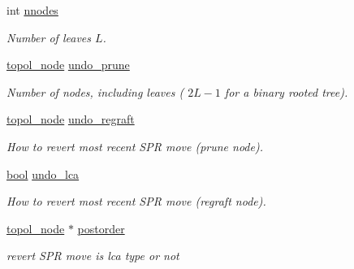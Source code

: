 \begin{DoxyCompactItemize}
\mbox{\label{structtopology__struct_a7eab86ca5fc4e2c0df67b39065eaed95}} 
int \hyperlink{structtopology__struct_a7eab86ca5fc4e2c0df67b39065eaed95}{nnodes}
\begin{DoxyCompactList}\small\item\em Number of leaves $L$. \end{DoxyCompactList}\item 
\mbox{\label{structtopology__struct_ade334ca8a90127e831eb67326bf159f5}} 
\hyperlink{structtopol__node__struct}{topol\+\_\+node} \hyperlink{structtopology__struct_ade334ca8a90127e831eb67326bf159f5}{undo\+\_\+prune}
\begin{DoxyCompactList}\small\item\em Number of nodes, including leaves ( $ 2L-1$ for a binary rooted tree). \end{DoxyCompactList}\item 
\mbox{\label{structtopology__struct_a935865d3894e0918dbf7e9b6d74ee74d}} 
\hyperlink{structtopol__node__struct}{topol\+\_\+node} \hyperlink{structtopology__struct_a935865d3894e0918dbf7e9b6d74ee74d}{undo\+\_\+regraft}
\begin{DoxyCompactList}\small\item\em How to revert most recent S\+PR move (prune node). \end{DoxyCompactList}\item 
\mbox{\label{structtopology__struct_a69d8ce96ed99816f3cff56af36c9b44e}} 
\hyperlink{lowlevel_8h_a97a80ca1602ebf2303258971a2c938e2}{bool} \hyperlink{structtopology__struct_a69d8ce96ed99816f3cff56af36c9b44e}{undo\+\_\+lca}
\begin{DoxyCompactList}\small\item\em How to revert most recent S\+PR move (regraft node). \end{DoxyCompactList}\item 
\mbox{\label{structtopology__struct_a4a4ec9adb1812fa74c50b1355ed43711}} 
\hyperlink{structtopol__node__struct}{topol\+\_\+node} $\ast$ \hyperlink{structtopology__struct_a4a4ec9adb1812fa74c50b1355ed43711}{postorder}
\begin{DoxyCompactList}\small\item\em revert S\+PR move is lca type or not \end{DoxyCompactList}\item 

\end{DoxyCompactItemize}

